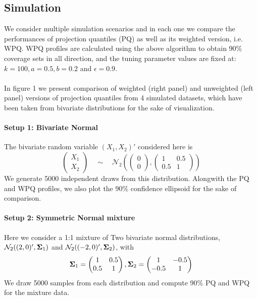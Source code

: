 \documentclass[10pt]{article}
\begin{document}
\begin{multicols}{2}
\section{Simulation}
We consider multiple simulation scenarios and in each one we compare the performances of projection quantiles (PQ) as well as its weighted version, i.e. WPQ. WPQ profiles are calculated using the above algorithm to obtain 90\% coverage sets in all direction, and the tuning parameter values are fixed at: $k=100, a=0.5, b=0.2$ and $\epsilon=0.9$.

\paragraph{}In figure 1 we present comparison of weighted (right panel) and unweighted (left panel) versions of projection quantiles from 4 simulated datasets, which have been taken from bivariate distributions for the sake of visualization.

\paragraph{Setup 1: Bivariate Normal}The bivariate random variable $(X_1,X_2)'$ considered here is
$$ \left(\begin{matrix}
X_1 \\ X_2
\end{matrix}\right) \quad\sim\quad \mathcal{N}_2\left(
\left(\begin{matrix}
0 \\ 0
\end{matrix}\right),
\left(\begin{matrix}
1 & 0.5 \\ 0.5 & 1
\end{matrix}\right)\right) $$
We generate 5000 independent draws from this distribution. Alongwith the PQ and WPQ profiles, we also plot the 90\% confidence ellipsoid for the sake of comparison.

\paragraph{Setup 2: Symmetric Normal mixture}Here we consider a 1:1 mixture of Two bivariate normal distributions, $\mathcal{N}_2((2,0)',{\boldsymbol{\Sigma}}_1)$ and $\mathcal{N}_2((-2,0)',{\boldsymbol{\Sigma}}_2)$, with
$${\boldsymbol{\Sigma}}_1 = \left(\begin{matrix}
1 & 0.5 \\ 0.5 & 1
\end{matrix}\right),
{\boldsymbol{\Sigma}}_2 = \left(\begin{matrix}
1 & -0.5 \\ -0.5 & 1
\end{matrix}\right)$$
We draw 5000 samples from each distribution and compute 90\% PQ and WPQ for the mixture data.


\end{multicols}
\end{document}
